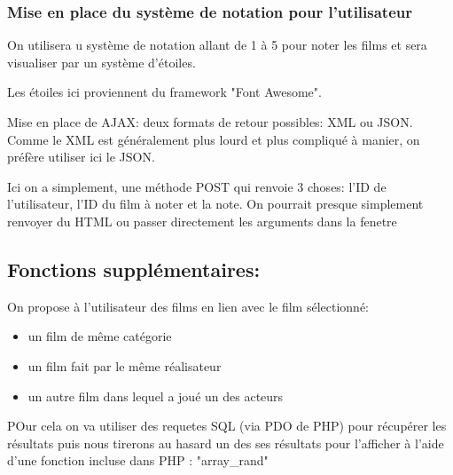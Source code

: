 \documentclass[a4paper, 11pt]{MyReport}
\begin{document}
				\subsubsection{Mise en place du système de notation pour l'utilisateur}

					On utilisera u système de notation allant de 1 à 5 pour noter les films et sera visualiser par un système d'étoiles.

					Les étoiles ici proviennent du framework "Font Awesome".

					\bigskip
					Mise en place de AJAX: deux formats de retour possibles: XML ou JSON. Comme le XML est généralement plus lourd et plus compliqué à manier, on préfère utiliser ici le JSON.

					Ici on a simplement, une méthode POST qui renvoie 3 choses: l'ID de l'utilisateur, l'ID du film à noter et la note. On pourrait presque simplement renvoyer du HTML ou passer directement les arguments dans la fenetre


			\subsection{Fonctions supplémentaires:}

				On propose à l'utilisateur des films en lien avec le film sélectionné:
				\begin{itemize}
					\item un film de même catégorie
					\item un film fait par le même réalisateur
					\item un autre film dans lequel a joué un des acteurs
				\end{itemize}

				POur cela on va utiliser des requetes SQL (via PDO de PHP) pour récupérer les résultats puis nous tirerons au hasard un des ses résultats pour l'afficher à l'aide d'une fonction incluse dans PHP : "array\_rand"



\end{document}
